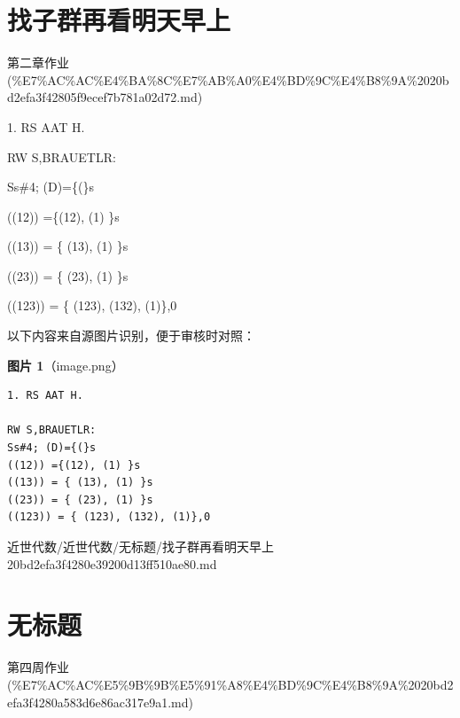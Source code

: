\section*{找子群再看明天早上}

\begin{note}[来源上级主题]

第二章作业 (\%E7\%AC\%AC\%E4\%BA\%8C\%E7\%AB\%A0\%E4\%BD\%9C\%E4\%B8\%9A\%2020bd2efa3f42805f9ecef7b781a02d72.md)

\end{note}

\begin{homework}

1. RS AAT H.

RW S,BRAUETLR:

Ss\#4; (D)=\{(\}s

((12)) =\{(12), (1) \}s

((13)) = \{ (13), (1) \}s

((23)) = \{ (23), (1) \}s

((123)) = \{ (123), (132), (1)\},0

\end{homework}

\begin{note}
以下内容来自源图片识别，便于审核时对照：

\textbf{图片 1}（image.png）
\begin{Verbatim}[fontsize=\small]
1. RS AAT H.

RW S,BRAUETLR:
Ss#4; (D)={(}s
((12)) ={(12), (1) }s
((13)) = { (13), (1) }s
((23)) = { (23), (1) }s
((123)) = { (123), (132), (1)},0
\end{Verbatim}

\end{note}

\begin{note}[来源路径]

近世代数/近世代数/无标题/找子群再看明天早上 20bd2efa3f4280e39200d13ff510ae80.md

\end{note}

\section*{无标题}

\begin{note}[来源上级主题]

第四周作业 (\%E7\%AC\%AC\%E5\%9B\%9B\%E5\%91\%A8\%E4\%BD\%9C\%E4\%B8\%9A\%2020bd2efa3f4280a583d6e86ac317e9a1.md)

\end{note}

